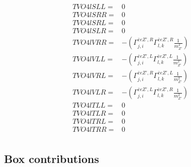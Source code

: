 \documentclass[A4,landscape]{article}
\begin{document}
\begin{align} 
  TVO4lSLL= & 0 \\ 
  TVO4lSRR= & 0 \\ 
  TVO4lSRL= & 0 \\ 
  TVO4lSLR= & 0 \\ 
  TVO4lVRR= & -(\Gamma^{\bar{e}e {Z'} ,R}_{j, i} \Gamma^{\bar{e}e {Z'} ,R}_{l, k} \frac{1}{m^2_{{Z'}}}) \\ 
  TVO4lVLL= & -(\Gamma^{\bar{e}e {Z'} ,L}_{j, i} \Gamma^{\bar{e}e {Z'} ,L}_{l, k} \frac{1}{m^2_{{Z'}}}) \\ 
  TVO4lVRL= & -(\Gamma^{\bar{e}e {Z'} ,R}_{j, i} \Gamma^{\bar{e}e {Z'} ,L}_{l, k} \frac{1}{m^2_{{Z'}}}) \\ 
  TVO4lVLR= & -(\Gamma^{\bar{e}e {Z'} ,L}_{j, i} \Gamma^{\bar{e}e {Z'} ,R}_{l, k} \frac{1}{m^2_{{Z'}}}) \\ 
  TVO4lTLL= & 0 \\ 
  TVO4lTLR= & 0 \\ 
  TVO4lTRL= & 0 \\ 
  TVO4lTRR= & 0 \\ 
\end{align} 
\subsection{Box contributions} 
\end{document}
